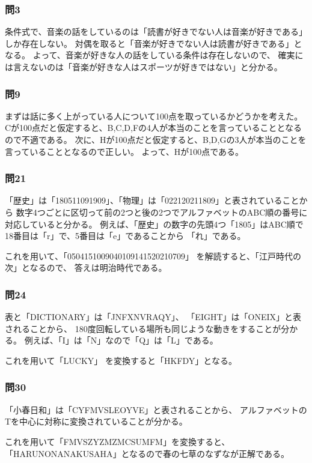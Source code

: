 \documentclass[12pt]{jarticle}
\begin{document}
\subsubsection*{問3}
条件式で、音楽の話をしているのは「読書が好きでない人は音楽が好きである」しか存在しない。
対偶を取ると「音楽が好きでない人は読書が好きである」となる。
よって、音楽が好きな人の話をしている条件は存在しないので、
確実には言えないのは「音楽が好きな人はスポーツが好きではない」と分かる。

\subsubsection*{問9}
まずは話に多く上がっている人について100点を取っているかどうかを考えた。
Cが100点だと仮定すると、B,C,D,Fの4人が本当のことを言っていることとなるので不適である。
次に、Hが100点だと仮定すると、B,D,Gの3人が本当のことを言っていることとなるので正しい。
よって、Hが100点である。

\clearpage
\subsubsection*{問21}
「歴史」は「180511091909」、「物理」は「022120211809」と表されていることから
数字4つごとに区切って前の2つと後の2つでアルファベットのABC順の番号に対応していると分かる。
例えば、「歴史」の数字の先頭4つ「1805」はABC順で18番目は「r」で、5番目は「e」であることから
「れ」である。

これを用いて、「0504151009040109141520210709」
を解読すると、「江戸時代の次」となるので、
答えは明治時代である。

\subsubsection*{問24}
表と「DICTIONARY」は「JNFXNVRAQY」、
「EIGHT」は「ONEIX」と表されることから、
180度回転している場所も同じような動きをすることが分かる。
例えば、「I」は「N」なので「Q」は「L」である。

これを用いて「LUCKY」
を変換すると「HKFDY」となる。

\subsubsection*{問30}
「小春日和」は「CYFMVSLEOYVE」と表されることから、
アルファベットのTを中心に対称に変換されていることが分かる。

これを用いて「FMVSZYZMZMCSUMFM」を変換すると、
「HARUNONANAKUSAHA」となるので春の七草のなずなが正解である。
\end{document}
